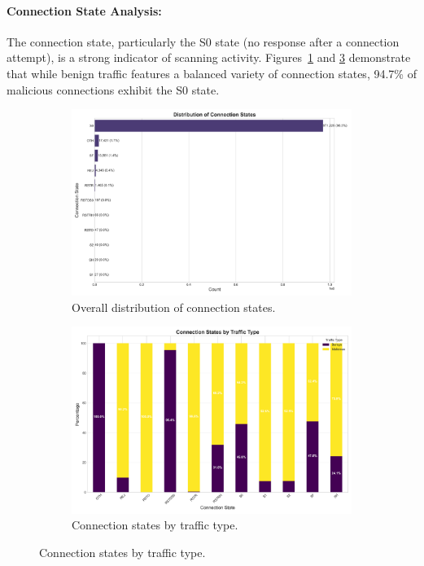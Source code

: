 \paragraph{Connection State Analysis:}  
The connection state, particularly the S0 state (no response after a connection attempt), is a strong indicator of scanning activity. Figures~\ref{fig:connection_states} and \ref{fig:connection_states_by_label} demonstrate that while benign traffic features a balanced variety of connection states, 94.7\% of malicious connections exhibit the S0 state.

\begin{figure}[htbp]
    \centering
    \begin{subfigure}[b]{0.48\textwidth}
        \centering
        \includegraphics[width=\textwidth]{figures/connection_states.png}
        \caption{Overall distribution of connection states.}
        \label{fig:connection_states}
    \end{subfigure}
    \hfill %
    \begin{subfigure}[b]{0.48\textwidth}
        \centering
        \includegraphics[width=\textwidth]{figures/connection_states_by_label.png}
        \caption{Connection states by traffic type.}
        \label{fig:connection_states_by_label}
    \end{subfigure}
    

\end{figure}
